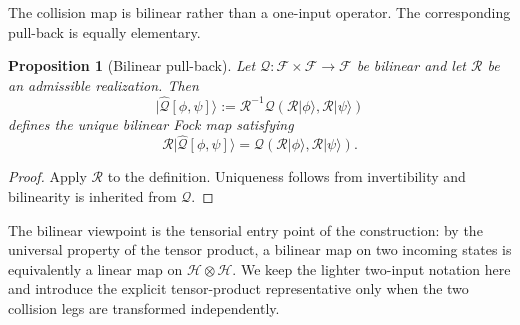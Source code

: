 \documentclass[11pt,oneside]{article}
\numberwithin{equation}{section}
\newtheorem{proposition}[theorem]{Proposition}
\theoremstyle{definition}
\begin{document}
The collision map is bilinear rather than a one-input operator.  The corresponding pull-back is equally elementary.
\begin{proposition}[Bilinear pull-back]
\label{prop:maxwell_bilinear_pullback}
Let $\mathcal Q:\mathscr F\times\mathscr F\to\mathscr F$ be bilinear and let $\mathcal R$ be an admissible realization.  Then
\begin{equation}
|\widehat{\mathcal Q}[\phi,\psi]\rangle
:=\mathcal R^{-1}\mathcal Q(\mathcal R|\phi\rangle,\mathcal R|\psi\rangle)
\label{eq:maxwell_general_bilinear_pullback}
\end{equation}
defines the unique bilinear Fock map satisfying
\begin{equation}
\mathcal R|\widehat{\mathcal Q}[\phi,\psi]\rangle
=\mathcal Q(\mathcal R|\phi\rangle,\mathcal R|\psi\rangle).
\label{eq:maxwell_general_bilinear_intertwining}
\end{equation}
\end{proposition}
\begin{proof}
Apply $\mathcal R$ to the definition.  Uniqueness follows from invertibility and bilinearity is inherited from $\mathcal Q$.
\end{proof}
The bilinear viewpoint is the tensorial entry point of the construction: by the universal property of the tensor product, a bilinear map on two incoming states is equivalently a linear map on $\mathscr H\otimes\mathscr H$.  We keep the lighter two-input notation here and introduce the explicit tensor-product representative only when the two collision legs are transformed independently.
\end{document}
